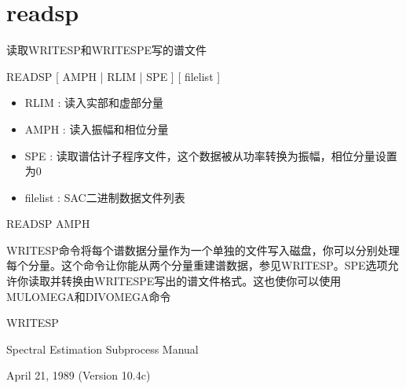 \section{readsp}
\label{cmd:readsp}

读取WRITESP和WRITESPE写的谱文件

READSP [ AMPH | RLIM | SPE ] [ filelist ]

\begin{itemize}
\item RLIM :  读入实部和虚部分量 
\item AMPH :  读入振幅和相位分量 
\item SPE : 读取谱估计子程序文件，这个数据被从功率转换为振幅，相位分量设置为0 
\item filelist : SAC二进制数据文件列表 
\end{itemize}

READSP AMPH

WRITESP命令将每个谱数据分量作为一个单独的文件写入磁盘，你可以分别处理每个分量。这个命令让你能从两个分量重建谱数据，参见WRITESP。SPE选项允许你读取并转换由WRITESPE写出的谱文件格式。这也使你可以使用MULOMEGA和DIVOMEGA命令

WRITESP

Spectral Estimation Subprocess Manual

April 21, 1989 (Version 10.4c)
